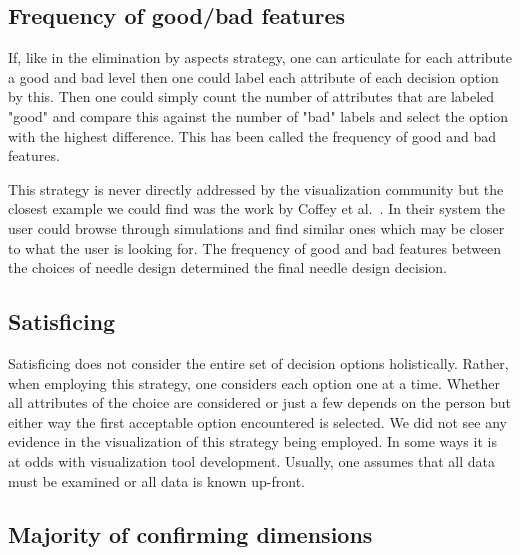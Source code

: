 \subsection{Frequency of good/bad features}
\label{frequency-of-goodbad-features}

If, like in the elimination by aspects strategy, one can articulate for
each attribute a good and bad level then one could label each attribute
of each decision option by this. Then one could simply count the number of
attributes that are labeled "good" and compare this against the number of
"bad" labels and select the option with the highest difference. This has
been called the frequency of good and bad features.

This strategy is never directly addressed by the visualization community
but the closest example we could find was the work by 
Coffey et al.~\citep{Coffey:2013}. In their system the user could browse
through simulations and find similar ones which may be closer to what
the user is looking for. The frequency of good and bad features between the
choices of needle design determined the final needle design decision.

\subsection{Satisficing}\label{satisficing}

Satisficing does not consider the entire set of decision options holistically.
Rather, when employing this strategy, one considers each option one at a time.
Whether all attributes of the choice are considered or just a few depends on
the person but either way the first acceptable option encountered is selected.
We did not see any evidence in the visualization of this strategy being
employed. In some ways it is at odds with visualization tool development.
Usually, one assumes that all data must be examined or all data is known
up-front.

\subsection{Majority of confirming
dimensions}\label{majority-of-confirming-dimensions}

